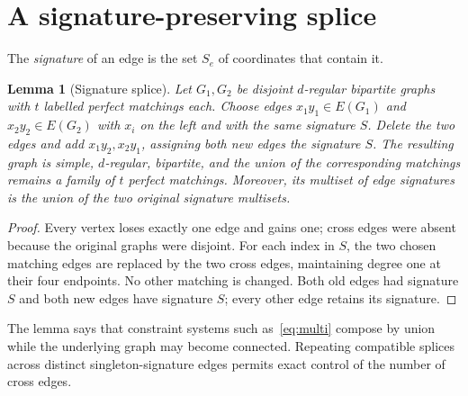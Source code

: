 \documentclass[10pt]{article}
\newtheorem{lemma}[theorem]{Lemma}
\begin{document}
\section{A signature-preserving splice}
The \emph{signature} of an edge is the set $S_e$ of coordinates that contain it.
\begin{lemma}[Signature splice]\label{lem:splice}
Let $G_1,G_2$ be disjoint $d$-regular bipartite graphs with $t$ labelled perfect matchings each. Choose edges $x_1y_1\in E(G_1)$ and $x_2y_2\in E(G_2)$ with $x_i$ on the left and with the same signature $S$. Delete the two edges and add $x_1y_2,x_2y_1$, assigning both new edges the signature $S$. The resulting graph is simple, $d$-regular, bipartite, and the union of the corresponding matchings remains a family of $t$ perfect matchings. Moreover, its multiset of edge signatures is the union of the two original signature multisets.
\end{lemma}
\begin{proof}
Every vertex loses exactly one edge and gains one; cross edges were absent because the original graphs were disjoint. For each index in $S$, the two chosen matching edges are replaced by the two cross edges, maintaining degree one at their four endpoints. No other matching is changed. Both old edges had signature $S$ and both new edges have signature $S$; every other edge retains its signature.
\end{proof}
The lemma says that constraint systems such as~\eqref{eq:multi} compose by union while the underlying graph may become connected. Repeating compatible splices across distinct singleton-signature edges permits exact control of the number of cross edges.
\end{document}
